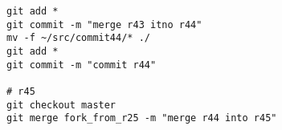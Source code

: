 
\tiny
\begin{verbatim}
git add *
git commit -m "merge r43 itno r44"
mv -f ~/src/commit44/* ./
git add *
git commit -m "commit r44"

# r45
git checkout master
git merge fork_from_r25 -m "merge r44 into r45"
\end{verbatim}
\normalsize